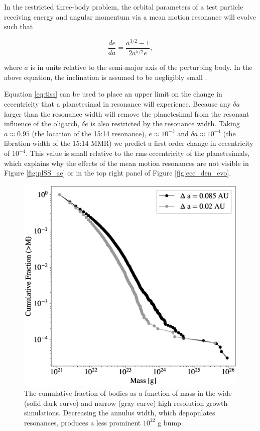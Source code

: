In the restricted three-body problem, the orbital parameters of a test particle receiving energy and angular momentum via a 
mean motion resonance will evolve such that

\begin{equation}\label{eq:tiss}
\frac{de}{da} = \frac{a^{3/2} - 1}{2 a^{5/2} e},
\end{equation}

\noindent where $a$ is in units relative to the semi-major axis of the perturbing body. In the above equation, the inclination is 
assumed to be negligibly small \cite{murray00}.

Equation \ref{eq:tiss} can be used to place an upper limit on the change in eccentricity that a planetesimal in resonance will 
experience. Because any $\delta a$ larger than the resonance width will remove the planetesimal from the resonant influence of 
the oligarch, $\delta e$ is also restricted by the resonance width. Taking $a \approx 0.95$ (the location of the 15:14 resonance), 
$e \approx 10^{-3}$ and $\delta a \approx 10^{-4}$ (the libration width of the 15:14 MMR) we predict a first order change in 
eccentricity of $10^{-4}$. This value is small relative to the rms eccentricity of the planetesimals, which explains why the effects 
of the  mean motion resonances are not visible in Figure \ref{fig:plSS_ae} or in the top right panel of Figure \ref{fig:ecc_den_evo}.

\begin{figure}
    \includegraphics[width=\columnwidth]{figures/plSS/mass_spectrum_comp.eps}
    \caption{The cumulative fraction of bodies as a function of mass in the wide (solid dark curve) and narrow (gray curve) high 
    resolution growth simulations. Decreasing the annulus width, which depopulates resonances, produces a less prominent 
    $10^{22}$ g bump.
    \label{fig:mass_spectrum_comp}}
\end{figure}

